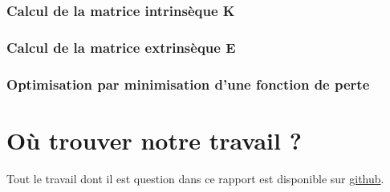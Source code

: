 \documentclass[12pt]{article}
\begin{document}
\subsubsection{Calcul de la matrice intrinsèque K}

\subsubsection{Calcul de la matrice extrinsèque E}

\subsubsection{Optimisation par minimisation d'une fonction de perte}

\newpage

\section{Où trouver notre travail ?}

Tout le travail dont il est question dans ce rapport est disponible sur \href{https://github.com/antoinedenovembre/3d_reconstruction}{github}.

\newpage

\newpage
\renewcommand{\refname}{Bibliography}



\end{document}

